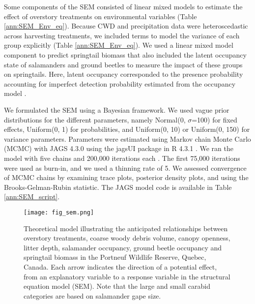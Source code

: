 Some components of the SEM consisted of linear mixed models to estimate the effect of overstory treatments on environmental variables (Table \ref{ann:SEM_Env_eq}). 
Because CWD and precipitation data were heteroscedastic across harvesting treatments, we included terms to model the variance of each group explicitly (Table \ref{ann:SEM_Env_eq}). 
We used a linear mixed model component to predict springtail biomass that also included the latent occupancy state of salamanders and ground beetles to measure the impact of these groups on springtails. 
Here, latent occupancy corresponded to the presence probability accounting for imperfect detection probability estimated from the occupancy model \citep{mackenzieOccupancyEstimationModeling2006a}.

We formulated the SEM using a Bayesian framework. 
We used vague prior distributions for the different parameters, namely Normal(0, $\sigma$=100) for fixed effects, Uniform(0, 1) for probabilities, and Uniform(0, 10) or Uniform(0, 150) for variance parameters. 
Parameters were estimated using Markov chain Monte Carlo (MCMC) with JAGS 4.3.0 using the jagsUI package in R 4.3.1 \citep{lunnBUGSProjectEvolution2009,rcoreteamLanguageEnvironmentStatistical2020,kellnerJagsUIWrapperRjags2024}. 
We ran the model with five chains and 200,000 iterations each \citep{gelmanUnderstandingPredictiveInformation2014}. 
The first 75,000 iterations were used as burn-in, and we used a thinning rate of 5. 
We assessed convergence of MCMC chains by examining trace plots, posterior density plots, and using the Brooks-Gelman-Rubin statistic. 
The JAGS model code is available in Table \ref{ann:SEM_script}.

\vspace{10pt}

\begin{figure}[h!]
	\centering
	\texttt{[image: fig\_sem.png]}
	\caption[Theoretical model illustrating the anticipated relationships between overstory treatments, environmental variables and species groups.]
  {Theoretical model illustrating the anticipated relationships between overstory treatments, coarse woody debris volume, canopy openness, litter depth,
   salamander occupancy, ground beetle occupancy and springtail biomass in the Portneuf Wildlife Reserve, Quebec, Canada. 
   Each arrow indicates the direction of a potential effect, from an explanatory variable to a response variable in the structural equation model (SEM). 
   Note that the large and small carabid categories are based on salamander gape size.}
	\label{fig:SEM}
\end{figure} 

